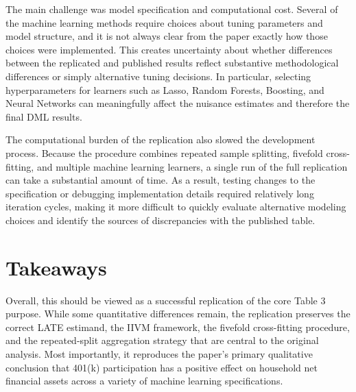 \documentclass[12pt]{article}
\begin{document}
The main challenge was model specification and computational cost. Several of the machine learning methods require choices about tuning parameters and model structure, and it is not always clear from the paper exactly how those choices were implemented. This creates uncertainty about whether differences between the replicated and published results reflect substantive methodological differences or simply alternative tuning decisions. In particular, selecting hyperparameters for learners such as Lasso, Random Forests, Boosting, and Neural Networks can meaningfully affect the nuisance estimates and therefore the final DML results.

The computational burden of the replication also slowed the development process. Because the procedure combines repeated sample splitting, fivefold cross-fitting, and multiple machine learning learners, a single run of the full replication can take a substantial amount of time. As a result, testing changes to the specification or debugging implementation details required relatively long iteration cycles, making it more difficult to quickly evaluate alternative modeling choices and identify the sources of discrepancies with the published table.

\section{Takeaways}

Overall, this should be viewed as a successful replication of the core Table 3 purpose. While some quantitative differences remain, the replication preserves the correct LATE estimand, the IIVM framework, the fivefold cross-fitting procedure, and the repeated-split aggregation strategy that are central to the original analysis. Most importantly, it reproduces the paper's primary qualitative conclusion that 401(k) participation has a positive effect on household net financial assets across a variety of machine learning specifications.



\end{document}
